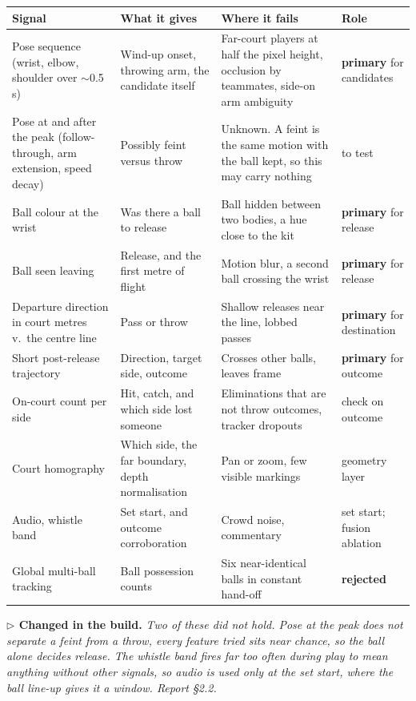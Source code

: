 \documentclass[10pt,a4paper]{article}
\newcommand{\changed}[1]{%
  \par\smallskip\noindent
  {\color{accent!88!black}\small\textbf{$\triangleright$ Changed in the build.} \textit{#1}}\par\smallskip}
\begin{document}
{\footnotesize
\begin{xltabular}{\textwidth}{L{31mm} L{34mm} X L{18mm}}
\toprule
\textbf{Signal} & \textbf{What it gives} & \textbf{Where it fails} & \textbf{Role}\\
\midrule
Pose sequence (wrist, elbow, shoulder over $\sim$0.5\,s) & Wind-up onset, throwing arm, the candidate itself & Far-court players at half the pixel height, occlusion by teammates, side-on arm ambiguity & \textbf{primary} for candidates\\
Pose at and after the peak (follow-through, arm extension, speed decay) & Possibly feint versus throw & Unknown. A feint is the same motion with the ball kept, so this may carry nothing & to test\\
Ball colour at the wrist & Was there a ball to release & Ball hidden between two bodies, a hue close to the kit & \textbf{primary} for release\\
Ball seen leaving & Release, and the first metre of flight & Motion blur, a second ball crossing the wrist & \textbf{primary} for release\\
Departure direction in court metres v.\ the centre line & Pass or throw & Shallow releases near the line, lobbed passes & \textbf{primary} for destination\\
Short post-release trajectory & Direction, target side, outcome & Crosses other balls, leaves frame & \textbf{primary} for outcome\\
On-court count per side & Hit, catch, and which side lost someone & Eliminations that are not throw outcomes, tracker dropouts & check on outcome\\
Court homography & Which side, the far boundary, depth normalisation & Pan or zoom, few visible markings & geometry layer\\
Audio, whistle band & Set start, and outcome corroboration & Crowd noise, commentary & set start; fusion ablation\\
Global multi-ball tracking & Ball possession counts & Six near-identical balls in constant hand-off & \textbf{rejected}\\
\bottomrule
\end{xltabular}}

\changed{Two of these did not hold. Pose at the peak does not separate a feint from a
throw, every feature tried sits near chance, so the ball alone decides release. The whistle
band fires far too often during play to mean anything without other signals, so audio is
used only at the set start, where the ball line-up gives it a window. Report \S2.2.}
\end{document}
